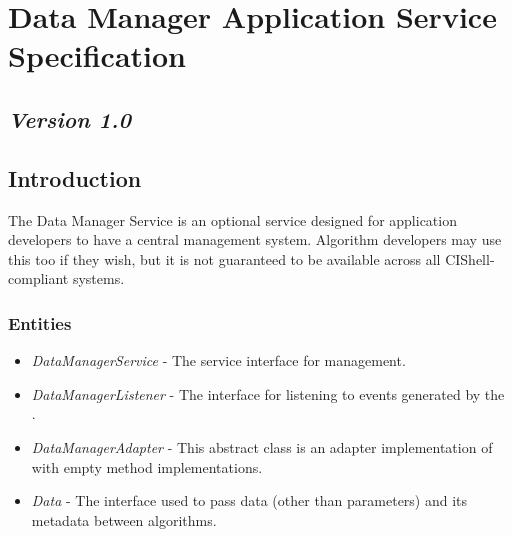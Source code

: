 \chapter{Data Manager Application Service Specification}

\section*{\textit{Version 1.0}}

\section{Introduction}

The Data Manager Service is an optional service designed for application
developers to have a central  management system. Algorithm
developers may use this too if they wish, but it is not guaranteed to be
available across all CIShell-compliant systems.

\subsection{Entities}

\begin{itemize}
  \item \textit{DataManagerService} - The service interface for 
  management.
  \item \textit{DataManagerListener} - The interface for listening to events
  generated by the .
  \item \textit{DataManagerAdapter} - This abstract class is an adapter
  implementation of  with empty method
  implementations.
  \item \textit{Data} - The interface used to pass data (other than
  parameters) and its metadata between algorithms.
\end{itemize}

\orgcishellappservicedatamanager{}